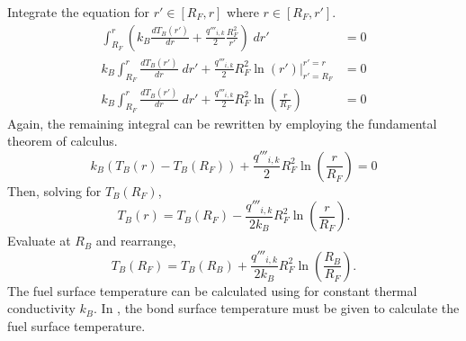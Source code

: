       Integrate the equation for $r' \in [R_F,r]$ where $r \in [R_F,r']$.
      \begin{align}
        \int_{R_F}^r \left( k_B \frac{dT_B(r')}{dr}
          + \frac{q'''_{i,k}}{2} \frac{R_F^2}{r'} \right) \; dr' &= 0 \\
        k_B \int_{R_F}^r \frac{dT_B(r')}{dr} \; dr'
          + \frac{q'''_{i,k}}{2} R_F^2 \left. \ln(r') \right|_{r'=R_F}^{r'=r} 
          &= 0\\
        k_B \int_{R_F}^r \frac{dT_B(r')}{dr} \; dr'
          + \frac{q'''_{i,k}}{2} R_F^2 \ln\left(\frac{r}{R_F}\right) &= 0 
      \end{align}
      Again, the remaining integral can be rewritten by employing the
      fundamental theorem of calculus.
      \begin{equation}
        \label{eq:tf_fundamental_theorem}
        k_B (T_B(r) - T_B(R_F)) + \frac{q'''_{i,k}}{2} R_F^2 
          \ln\left(\frac{r}{R_F}\right) = 0
      \end{equation}
      Then, solving for $T_B(R_F)$,
      \begin{equation}
        \label{eq:tbr}
        T_B(r) = T_B(R_F) - \frac{q'''_{i,k}}{2 k_B} R_F^2 
          \ln\left(\frac{r}{R_F}\right).
      \end{equation}
      Evaluate at $R_B$ and rearrange,
      \begin{equation}
        \label{eq:tf_forward}
        T_B(R_F) = T_B(R_B) + \frac{q'''_{i,k}}{2 k_B} R_F^2 
          \ln\left(\frac{R_B}{R_F}\right).
      \end{equation}
      The fuel surface temperature can be calculated using
       for constant thermal conductivity $k_B$.
      In , the bond surface temperature must be
      given to calculate the fuel surface temperature.

